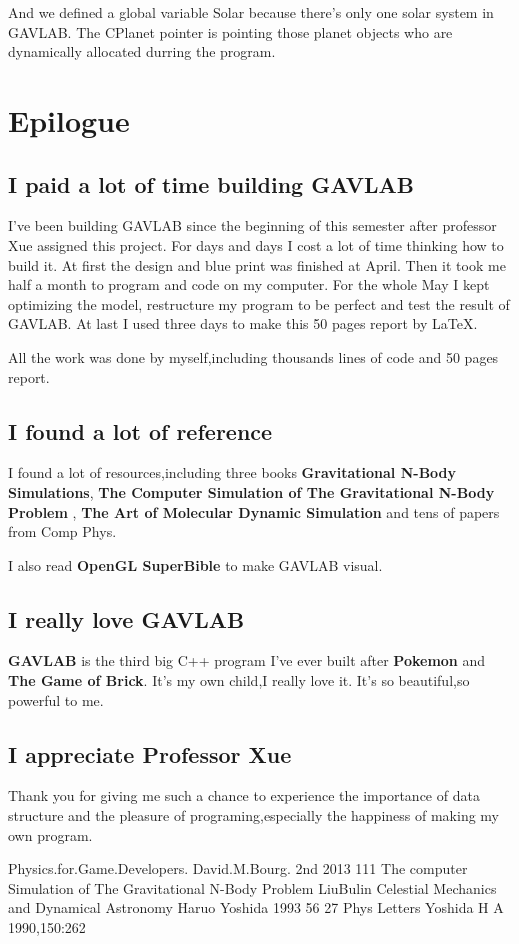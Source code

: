 \documentclass[12pt]{article}
\begin{document}
And we defined a global variable Solar because there's only one solar system in GAVLAB.
The CPlanet pointer is pointing those planet objects who are dynamically allocated durring the program.
\clearpage


\section{Epilogue}
\subsection{I paid a lot of time building GAVLAB}
I've been building GAVLAB since the beginning of this semester after professor Xue assigned this project.
For days and days I cost a lot of time thinking how to build it.
At first the design and blue print was finished at April.
Then it took me half a month to program and code on my computer.
For the whole May I kept optimizing the model, restructure my program to be perfect
and test the result of GAVLAB.
At last I used three days to make this 50 pages report by \LaTeX .

All the work was done by myself,including thousands lines of code and 50 pages report.
\subsection{I found a lot of reference}
I found a lot of resources,including three books \textbf{Gravitational N-Body Simulations},
\textbf{The Computer Simulation of The Gravitational N-Body Problem } , \textbf{The Art of Molecular Dynamic Simulation}
and tens of papers from Comp Phys.

I also read \textbf{OpenGL SuperBible} to make GAVLAB visual.
\subsection{I really love GAVLAB}
\textbf{GAVLAB} is the third big C++ program I've ever built after \textbf{Pokemon} and \textbf{The Game of Brick}.
It's my own child,I really love it.
It's so beautiful,so powerful to me.
\subsection{I appreciate Professor Xue}
Thank you for giving me such a chance to experience the importance of data structure and the pleasure
of programing,especially the happiness of making my own program.



\clearpage
\begin{thebibliography}{99}
Physics.for.Game.Developers. David.M.Bourg. 2nd 2013 111
The computer Simulation of The Gravitational N-Body Problem LiuBulin
Celestial Mechanics and Dynamical Astronomy Haruo Yoshida 1993 56 27
Phys Letters Yoshida H A 1990,150:262
\end{thebibliography}
\end{document}
